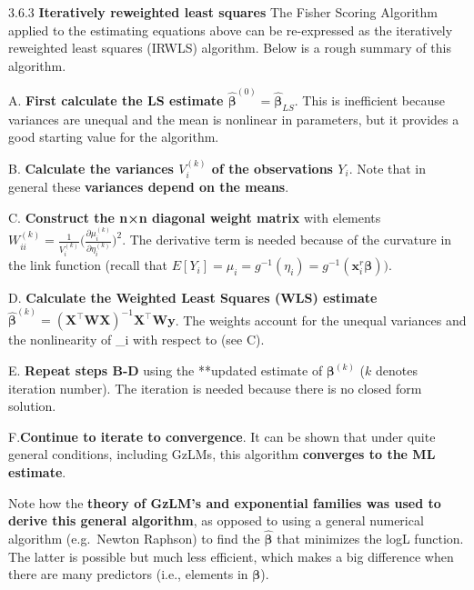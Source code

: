 \documentclass[
  9pt,
  ignorenonframetext,
]{beamer}
\begin{document}
\begin{frame}{3.6.3 \textbf{Iteratively reweighted least squares}}
\protect\hypertarget{iteratively-reweighted-least-squares}{}
The Fisher Scoring Algorithm applied to the estimating equations above
can be re-expressed as the iteratively reweighted least squares (IRWLS)
algorithm. Below is a rough summary of this algorithm.

A. \textbf{First calculate the LS estimate
\(\pmb {\hat \beta} ^{(0)} = \pmb {\hat \beta}_{LS}\)}. This is
inefficient because variances are unequal and the mean is nonlinear in
parameters, but it provides a good starting value for the algorithm.

B. \textbf{Calculate the variances \(V_i^{(k)}\) of the observations
\(Y_i\)}. Note that in general these \textbf{variances depend on the
means}.

C. \textbf{Construct the n×n diagonal weight matrix} with elements
\(W_{ii}^{(k)}= \frac 1 {V_i^{(k)}} \Bigg(\frac {\partial\mu_i^{(k)}} {\partial\eta_i^{(k)}} \Bigg)^2\).
The derivative term is needed because of the curvature in the link
function (recall that
\(E[Y_i] =\mu_i=g^{-1} (\eta_i)=g^{-1} (\pmb x_i^r \pmb \beta))\).

D. \textbf{Calculate the Weighted Least Squares (WLS) estimate
\(\pmb {\hat \beta}^{(k)} = (\pmb X^{\top} \pmb {WX} )^{-1} \pmb X^{\top} \pmb {Wy}\)}.
The weights account for the unequal variances and the nonlinearity of
\mu\_i with respect to \beta (see C).

E. \textbf{Repeat steps B-D} using the **updated estimate of
\(\pmb \beta^{(k)}\) (\(k\) denotes iteration number). The iteration is
needed because there is no closed form solution.

F.\textbf{Continue to iterate to convergence}. It can be shown that
under quite general conditions, including GzLMs, this algorithm
\textbf{converges to the ML estimate}.
\end{frame}

\begin{frame}{}
\protect\hypertarget{section-5}{}
Note how the \textbf{theory of GzLM's and exponential families was used
to derive this general algorithm}, as opposed to using a general
numerical algorithm (e.g.~Newton Raphson) to find the
\(\pmb {\hat \beta}\) that minimizes the logL function. The latter is
possible but much less efficient, which makes a big difference when
there are many predictors (i.e., elements in \(\pmb \beta\)).
\end{frame}
\end{document}
